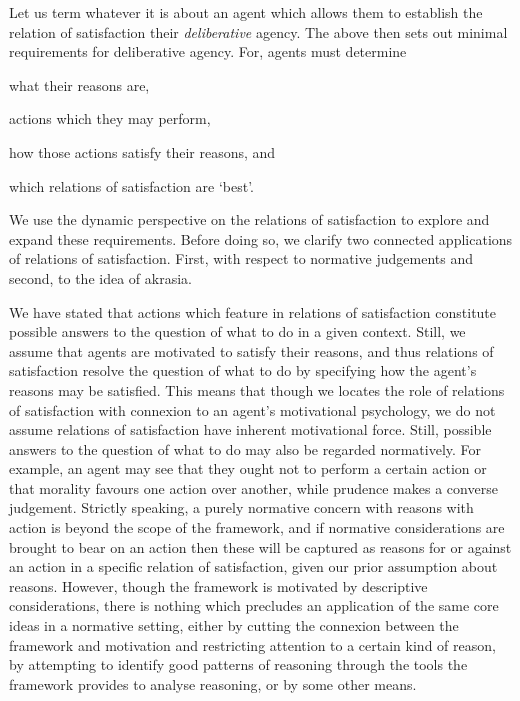 \documentclass[10pt]{article}
\newcounter{subsubsubsection}[subsubsection]
\begin{document}
Let us term whatever it is about an agent which allows them to establish the relation of satisfaction their \emph{deliberative} agency.
The above then sets out minimal requirements for deliberative agency.
For, agents must determine
\begin{enumerate*}[label=(\alph*)]
\item\label{isp:reasons} what their reasons are,
\item\label{isp:actions} actions which they may perform,
\item\label{isp:satisfy} how those actions satisfy their reasons, and
\item\label{isp:bestrel} which relations of satisfaction are `best'.
\end{enumerate*}
We use the dynamic perspective on the relations of satisfaction to explore and expand these requirements.
Before doing so, we clarify two connected applications of relations of satisfaction.
First, with respect to normative judgements and second, to the idea of akrasia.

\label{sec:normative-judgements}

We have stated that actions which feature in relations of satisfaction constitute possible answers to the question of what to do in a given context.
Still, we assume that agents are motivated to satisfy their reasons, and thus relations of satisfaction resolve the question of what to do by specifying how the agent's reasons may be satisfied.
This means that though we locates the role of relations of satisfaction with connexion to an agent's motivational psychology, we do not assume relations of satisfaction have inherent motivational force.
Still, possible answers to the question of what to do may also be regarded normatively.
For example, an agent may see that they ought not to perform a certain action or that morality favours one action over another, while prudence makes a converse judgement.
Strictly speaking, a purely normative concern with reasons with action is beyond the scope of the framework, and if normative considerations are brought to bear on an action then these will be captured as reasons for or against an action in a specific relation of satisfaction, given our prior assumption about reasons.
However, though the framework is motivated by descriptive considerations, there is nothing which precludes an application of the same core ideas in a normative setting, either by cutting the connexion between the framework and motivation and restricting attention to a certain kind of reason, by attempting to identify good patterns of reasoning through the tools the framework provides to analyse reasoning, or by some other means.
\end{document}
